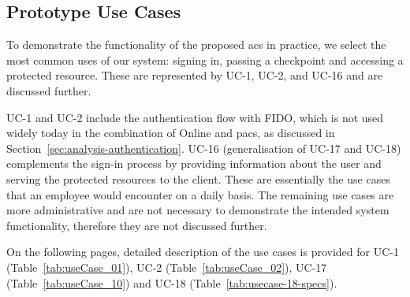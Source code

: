 \subsection{Prototype Use Cases} \label{sec:design-prototype-usecases}
To demonstrate the functionality of the proposed \acrshort{acs} in practice, we select the most common uses of our system: signing in, passing a checkpoint and accessing a protected resource. These are represented by UC-1, UC-2, and UC-16 and are discussed further.  

UC-1 and UC-2 include the authentication flow with FIDO, which is not used widely today in the combination of Online and \acrlong{pacs}, as discussed in Section~\ref{sec:analysis-authentication}. UC-16 (generalisation of UC-17 and UC-18) complements the sign-in process by providing information about the user and serving the protected resources to the client. These are essentially the use cases that an employee would encounter on a daily basis. The remaining use cases are more administrative and are not necessary to demonstrate the intended system functionality, therefore they are not discussed further.


On the following pages, detailed description of the use cases is provided for UC-1 (Table~\ref{tab:useCase_01}), UC-2 (Table~\ref{tab:useCase_02}), UC-17 (Table~\ref{tab:useCase_10}) and UC-18 (Table~\ref{tab:usecase-18-specs}).


\restoregeometry